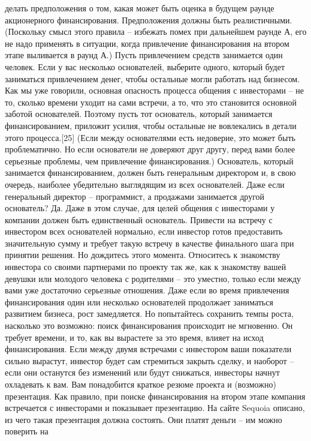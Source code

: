 \documentclass[ebook,12pt,oneside,openany]{memoir}
\begin{document}
делать предположения о том, какая может быть оценка в будущем раунде
акционерного финансирования. Предположения должны быть реалистичными.
(Поскольку смысл этого правила – избежать помех при дальнейшем раунде
А, его не надо применять в ситуации, когда привлечение финансирования
на втором этапе выливается в раунд А.) Пусть привлечением средств
занимается один человек. Если у вас несколько основателей, выберите
одного, который будет заниматься привлечением денег, чтобы остальные
могли работать над бизнесом. Как мы уже говорили, основная опасность
процесса общения с инвесторами – не то, сколько времени уходит на сами
встречи, а то, что это становится основной заботой основателей.
Поэтому пусть тот основатель, который занимается финансированием,
приложит усилия, чтобы остальные не вовлекались в детали этого
процесса.[25] (Если между основателями есть недоверие, это может быть
проблематично. Но если основатели не доверяют друг другу, перед вами
более серьезные проблемы, чем привлечение финансирования.) Основатель,
который занимается финансированием, должен быть генеральным директором
и, в свою очередь, наиболее убедительно выглядящим из всех
основателей. Даже если генеральный директор – программист, а продажами
занимается другой основатель? Да. Даже в этом случае, для целей
общения с инвесторами у компании должен быть единственный основатель.
Привести на встречу с инвестором всех основателей нормально, если
инвестор готов предоставить значительную сумму и требует такую встречу
в качестве финального шага при принятии решения. Но дождитесь этого
момента. Относитесь к знакомству инвестора со своими партнерами по
проекту так же, как к знакомству вашей девушки или молодого человека с
родителями – это уместно, только если между вами уже достаточно
серьезные отношения. Даже если во время привлечения финансирования
один или несколько основателей продолжает заниматься развитием
бизнеса, рост замедляется. Но попытайтесь сохранить темпы роста,
насколько это возможно: поиск финансирования происходит не мгновенно.
Он требует времени, и то, как вы вырастете за это время, влияет на
исход финансирования. Если между двумя встречами с инвестором ваши
показатели сильно вырастут, инвестор будет сам стремиться закрыть
сделку, и наоборот – если они останутся без изменений или будут
снижаться, инвесторы начнут охладевать к вам. Вам понадобится краткое
резюме проекта и (возможно) презентация. Как правило, при поиске
финансирования на втором этапе компания встречается с инвесторами и
показывает презентацию. На сайте Sequoia описано, из чего такая
презентация должна состоять. Они платят деньги – им можно поверить на
\end{document}
